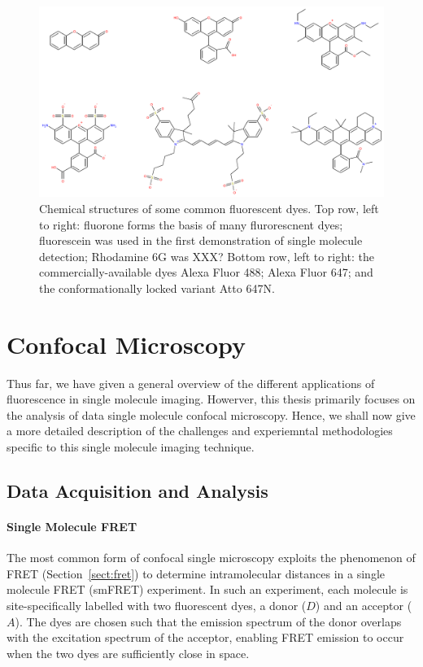 \begin{figure}
	\begin{center}
	\includegraphics*[clip=true, width=5in]{introduction/dyes.pdf}
	\caption{Chemical structures of some common fluorescent dyes. Top row, left to right: fluorone forms the basis of many flurorescnent dyes; fluorescein was used in the first demonstration of single molecule detection; Rhodamine 6G was XXX? Bottom row, left to right: the commercially-available dyes Alexa Fluor 488; Alexa Fluor 647; and the conformationally locked variant Atto 647N.}
	\label{fig:dyes}
	\end{center}
\end{figure}


\section{Confocal Microscopy}
Thus far, we have given a general overview of the different applications of fluorescence in single molecule imaging. Howerver, this thesis primarily focuses on the analysis of data single molecule confocal microscopy. Hence, we shall now give a more detailed description of the challenges and experiemntal methodologies specific to this single molecule imaging technique.

\subsection{Data Acquisition and Analysis}
\paragraph{Single Molecule FRET}
The most common form of confocal single microscopy exploits the phenomenon of FRET (Section~\ref{sect:fret}) to determine intramolecular distances in a single molecule FRET (smFRET) experiment. In such an experiment, each molecule is site-specifically labelled with two fluorescent dyes, a donor ($D$) and an acceptor ($A$). The dyes are chosen such that the emission spectrum of the donor overlaps with the excitation spectrum of the acceptor, enabling FRET emission to occur when the two dyes are sufficiently close in space. 

